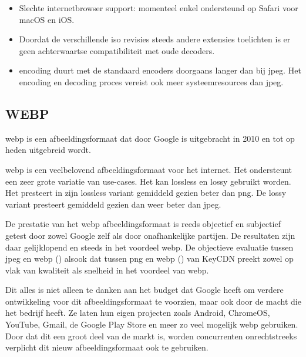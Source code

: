 \begin{itemize}
	\item Slechte internetbrowser support: momenteel enkel ondersteund op Safari voor macOS en iOS. 
	
	\item Doordat de verschillende \gls{iso} revisies steeds andere \glspl{extensie} toelichten is er geen achterwaartse compatibiliteit met oude \glspl{decoder}.
	
	\item \Gls{encoding} duurt met de standaard \glspl{encoder} doorgaans langer dan bij \gls{jpeg}. Het \gls{encoding} en \gls{decoding} proces vereist ook meer systeemresources dan \gls{jpeg}.
\end{itemize}

\subsection{WEBP}
\label{sec:afbeeldingscompressie-webp}

\Gls{webp} is een \gls{afbeeldingsformaat} dat door Google is uitgebracht in 2010 en tot op heden uitgebreid wordt. 
 
\Gls{webp} is een veelbelovend \gls{afbeeldingsformaat} voor het internet. Het ondersteunt een zeer grote variatie van \glspl{use-case}. Het kan \gls{lossless} en \gls{lossy} gebruikt worden. Het presteert in zijn \gls{lossless} variant gemiddeld gezien beter dan \gls{png}. De \gls{lossy} variant presteert gemiddeld gezien dan weer beter dan \gls{jpeg}.

De prestatie van het \gls{webp} \gls{afbeeldingsformaat} is reeds objectief en subjectief getest door zowel Google zelf als door onafhankelijke partijen. De resultaten zijn daar gelijklopend en steeds in het voordeel \gls{webp}. De objectieve evaluatie tussen \gls{jpeg} en \gls{webp} (\cite{jpegwebp}) alsook dat tussen \gls{png} en \gls{webp} (\cite{pngwebp}) van KeyCDN preekt zowel op vlak van kwaliteit als snelheid in het voordeel van \gls{webp}.

Dit alles is niet alleen te danken aan het budget dat Google heeft om verdere ontwikkeling voor dit \gls{afbeeldingsformaat} te voorzien, maar ook door de macht die het bedrijf heeft. Ze laten hun eigen projecten zoals Android, ChromeOS, YouTube, Gmail, de Google Play Store en meer zo veel mogelijk \gls{webp} gebruiken. Door dat dit een groot deel van de markt is, worden concurrenten onrechtstreeks verplicht dit nieuw \gls{afbeeldingsformaat} ook te gebruiken.

